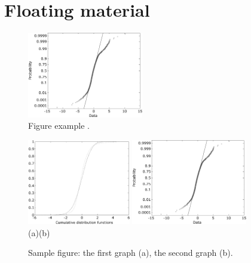 \documentclass{amcs}
\begin{document}
\section{Floating material}
%
\begin{figure}[!b]
 \centering
  \includegraphics[width=0.45\textwidth]{fig1}
 \caption{Figure example \protect \cite{Haykin:99}.}
  \label{fig1}
\end{figure}
%
\begin{figure}[!t]
 \centering
  \includegraphics[width=0.40\textwidth]{fig2a}\hspace{0.5cm}
  \includegraphics[width=0.45\textwidth]{fig2b}\\
  (a)\hspace{8cm}(b)
  \caption{Sample figure: the first graph (a), the second graph (b).}
  \label{fig2}
\end{figure}
%
\end{document}
